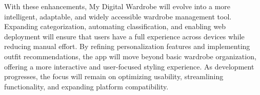 With these enhancements, My Digital Wardrobe will evolve into a more intelligent, adaptable, and widely accessible wardrobe management tool. Expanding categorization, automating classification, and enabling web deployment will ensure that users have a full experience across devices while reducing manual effort. By refining personalization features and implementing outfit recommendations, the app will move beyond basic wardrobe organization, offering a more interactive and user-focused styling experience. As development progresses, the focus will remain on optimizing usability, streamlining functionality, and expanding platform compatibility.


